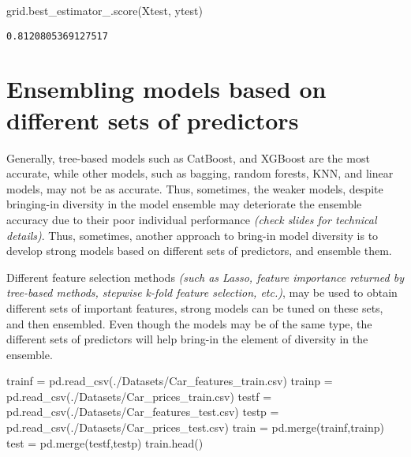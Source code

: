 \documentclass[
  letterpaper,
  DIV=11,
  numbers=noendperiod]{scrreprt}
\newenvironment{Shaded}{\begin{snugshade}}{\end{snugshade}}
\newcommand{\NormalTok}[1]{\textcolor[rgb]{0.00,0.23,0.31}{#1}}
\newcommand{\OperatorTok}[1]{\textcolor[rgb]{0.37,0.37,0.37}{#1}}
\newcommand{\StringTok}[1]{\textcolor[rgb]{0.13,0.47,0.30}{#1}}
\begin{document}
\begin{Shaded}
\begin{Highlighting}[]
\NormalTok{grid.best\_estimator\_.score(Xtest, ytest)}
\end{Highlighting}
\end{Shaded}

\begin{verbatim}
0.8120805369127517
\end{verbatim}

\section{Ensembling models based on different sets of
predictors}\label{ensembling-models-based-on-different-sets-of-predictors}

Generally, tree-based models such as CatBoost, and XGBoost are the most
accurate, while other models, such as bagging, random forests, KNN, and
linear models, may not be as accurate. Thus, sometimes, the weaker
models, despite bringing-in diversity in the model ensemble may
deteriorate the ensemble accuracy due to their poor individual
performance \emph{(check slides for technical details)}. Thus,
sometimes, another approach to bring-in model diversity is to develop
strong models based on different sets of predictors, and ensemble them.

Different feature selection methods \emph{(such as Lasso, feature
importance returned by tree-based methods, stepwise k-fold feature
selection, etc.)}, may be used to obtain different sets of important
features, strong models can be tuned on these sets, and then ensembled.
Even though the models may be of the same type, the different sets of
predictors will help bring-in the element of diversity in the ensemble.

\begin{Shaded}
\begin{Highlighting}[]
\NormalTok{trainf }\OperatorTok{=}\NormalTok{ pd.read\_csv(}\StringTok{\textquotesingle{}./Datasets/Car\_features\_train.csv\textquotesingle{}}\NormalTok{)}
\NormalTok{trainp }\OperatorTok{=}\NormalTok{ pd.read\_csv(}\StringTok{\textquotesingle{}./Datasets/Car\_prices\_train.csv\textquotesingle{}}\NormalTok{)}
\NormalTok{testf }\OperatorTok{=}\NormalTok{ pd.read\_csv(}\StringTok{\textquotesingle{}./Datasets/Car\_features\_test.csv\textquotesingle{}}\NormalTok{)}
\NormalTok{testp }\OperatorTok{=}\NormalTok{ pd.read\_csv(}\StringTok{\textquotesingle{}./Datasets/Car\_prices\_test.csv\textquotesingle{}}\NormalTok{)}
\NormalTok{train }\OperatorTok{=}\NormalTok{ pd.merge(trainf,trainp)}
\NormalTok{test }\OperatorTok{=}\NormalTok{ pd.merge(testf,testp)}
\NormalTok{train.head()}
\end{Highlighting}
\end{Shaded}
\end{document}
